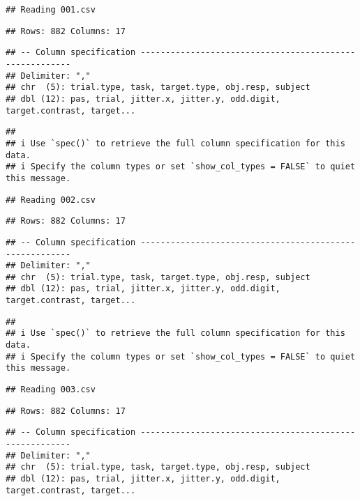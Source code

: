 \documentclass[
]{article}
\begin{document}
\begin{verbatim}
## Reading 001.csv
\end{verbatim}

\begin{verbatim}
## Rows: 882 Columns: 17
\end{verbatim}

\begin{verbatim}
## -- Column specification --------------------------------------------------------
## Delimiter: ","
## chr  (5): trial.type, task, target.type, obj.resp, subject
## dbl (12): pas, trial, jitter.x, jitter.y, odd.digit, target.contrast, target...
\end{verbatim}

\begin{verbatim}
## 
## i Use `spec()` to retrieve the full column specification for this data.
## i Specify the column types or set `show_col_types = FALSE` to quiet this message.
\end{verbatim}

\begin{verbatim}
## Reading 002.csv
\end{verbatim}

\begin{verbatim}
## Rows: 882 Columns: 17
\end{verbatim}

\begin{verbatim}
## -- Column specification --------------------------------------------------------
## Delimiter: ","
## chr  (5): trial.type, task, target.type, obj.resp, subject
## dbl (12): pas, trial, jitter.x, jitter.y, odd.digit, target.contrast, target...
\end{verbatim}

\begin{verbatim}
## 
## i Use `spec()` to retrieve the full column specification for this data.
## i Specify the column types or set `show_col_types = FALSE` to quiet this message.
\end{verbatim}

\begin{verbatim}
## Reading 003.csv
\end{verbatim}

\begin{verbatim}
## Rows: 882 Columns: 17
\end{verbatim}

\begin{verbatim}
## -- Column specification --------------------------------------------------------
## Delimiter: ","
## chr  (5): trial.type, task, target.type, obj.resp, subject
## dbl (12): pas, trial, jitter.x, jitter.y, odd.digit, target.contrast, target...
\end{verbatim}
\end{document}
